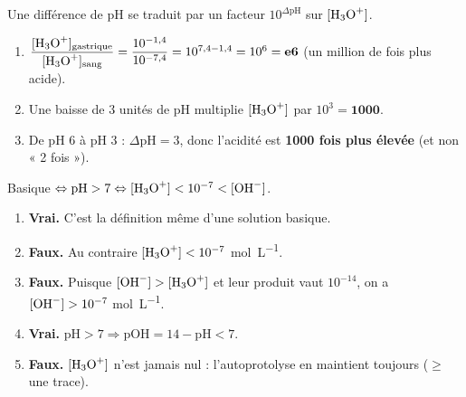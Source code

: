 \documentclass[11pt,a4paper]{article}
\begin{document}

\begin{corrige}
Une différence de pH se traduit par un facteur $10^{\Delta\mathrm{pH}}$ sur $[\ce{H3O+}]$.
\begin{enumerate}[label=\alph*)]
  \item $\dfrac{[\ce{H3O+}]_{\text{gastrique}}}{[\ce{H3O+}]_{\text{sang}}} = \dfrac{10^{-1{,}4}}{10^{-7{,}4}}
        = 10^{7{,}4 - 1{,}4} = 10^{6} = \mathbf{e6}$ (un million de fois plus acide).
  \item Une baisse de \num{3} unités de pH multiplie $[\ce{H3O+}]$ par $10^{3} = \mathbf{1000}$.
  \item De pH $6$ à pH $3$ : $\Delta\mathrm{pH} = 3$, donc l'acidité est \textbf{1000 fois plus élevée} (et non
        « 2 fois »).
\end{enumerate}
\end{corrige}

\begin{corrige}
Basique $\Leftrightarrow \mathrm{pH} > 7 \Leftrightarrow [\ce{H3O+}] < 10^{-7} < [\ce{OH-}]$.
\begin{enumerate}[label=\alph*)]
  \item \textbf{Vrai.} C'est la définition même d'une solution basique.
  \item \textbf{Faux.} Au contraire $[\ce{H3O+}] < 10^{-7}$ \si{mol\per L}.
  \item \textbf{Faux.} Puisque $[\ce{OH-}] > [\ce{H3O+}]$ et leur produit vaut $10^{-14}$, on a
        $[\ce{OH-}] > 10^{-7}$ \si{mol\per L}.
  \item \textbf{Vrai.} $\mathrm{pH} > 7 \Rightarrow \mathrm{pOH} = 14 - \mathrm{pH} < 7$.
  \item \textbf{Faux.} $[\ce{H3O+}]$ n'est jamais nul : l'autoprotolyse en maintient toujours ($\geq$ une trace).
\end{enumerate}
\end{corrige}
\end{document}

